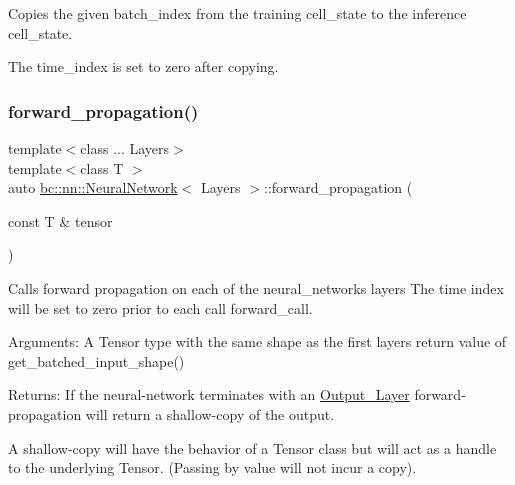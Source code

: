 Copies the given batch\+\_\+index from the training cell\+\_\+state to the inference cell\+\_\+state. 

The time\+\_\+index is set to zero after copying. \mbox{\label{structbc_1_1nn_1_1NeuralNetwork_af9aa894ca348fd7c44ec248416dcac41}} 
\subsubsection{\texorpdfstring{forward\+\_\+propagation()}{forward\_propagation()}}
{\footnotesize\ttfamily template$<$class ... Layers$>$ \\
template$<$class T $>$ \\
auto \hyperlink{structbc_1_1nn_1_1NeuralNetwork}{bc\+::nn\+::\+Neural\+Network}$<$ Layers $>$\+::forward\+\_\+propagation (\begin{DoxyParamCaption}\item[{const T \&}]{tensor }\end{DoxyParamCaption})\hspace{0.3cm}{\ttfamily [inline]}}



Calls forward propagation on each of the neural\+\_\+network\textquotesingle{}s layers The time index will be set to zero prior to each call forward\+\_\+call. 

Arguments\+: A Tensor type with the same shape as the first layer\textquotesingle{}s return value of \textquotesingle{}get\+\_\+batched\+\_\+input\+\_\+shape()\textquotesingle{}

Returns\+: If the neural-\/network terminates with an \hyperlink{structbc_1_1nn_1_1Output__Layer}{Output\+\_\+\+Layer} forward-\/propagation will return a \textquotesingle{}shallow-\/copy\textquotesingle{} of the output.

A shallow-\/copy will have the behavior of a Tensor class but will act as a handle to the underlying Tensor. (Passing by value will not incur a copy). \mbox{\label{structbc_1_1nn_1_1NeuralNetwork_abac51be609275fbafb7786530f1ffec9}} 
